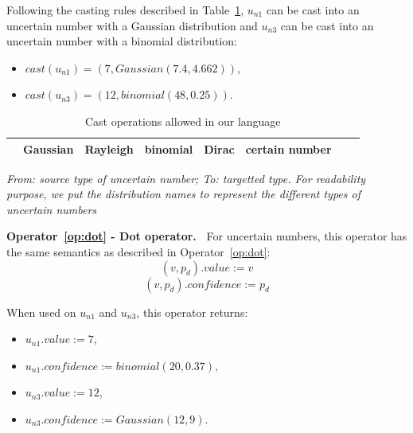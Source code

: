 Following the casting rules described in Table~\ref{table:allowed-cast-op},  $u_{n1}$ can be cast into an uncertain number with a Gaussian distribution and $u_{n3}$ can be cast into an uncertain number with a binomial distribution:
\begin{itemize}
	\item $cast(u_{n1}) = (7, Gaussian(7.4, 4.662))$,
	\item $cast(u_{n3}) = (12, binomial(48, 0.25))$.
\end{itemize}

\begin{table}
	\begin{center}
		\begin{tabular}{|c|c|c|c|c|c|c|c|}
			\hline	
			\diagbox{To}{From} & Gaussian & Rayleigh & binomial & Dirac & certain number\\
			\hline
			\hline
		\end{tabular}%
	\end{center}
	{\small
	\textit{From: source type of uncertain number; To: targetted type. For readability purpose, we put the distribution names to represent the different types of uncertain numbers}
	}
	\caption{Cast operations allowed in our language}
	\label{table:allowed-cast-op}
\end{table}

\bigskip

\noindent\textbf{Operator~\ref{op:dot} - Dot operator.~}
For uncertain numbers, this operator has the same semantics as described in Operator~\ref{op:dot}:
$$(v, p_d).value := v$$
$$(v, p_d).confidence := p_d$$

When used on $u_{n1}$ and $u_{n3}$, this operator returns:
\begin{itemize}
	\item $u_{n1}.value := 7$,
	\item $u_{n1}.confidence := binomial(20, 0.37)$,
	\item $u_{n3}.value := 12$,
	\item $u_{n3}.confidence := Gaussian(12, 9)$.
\end{itemize}

